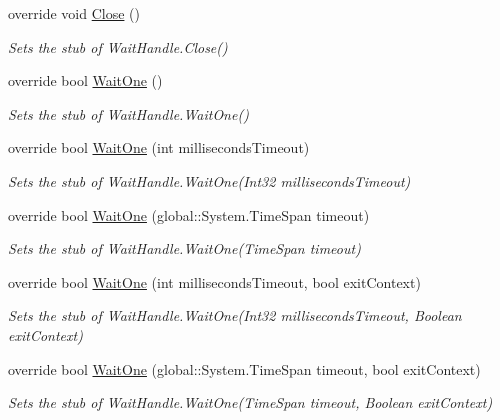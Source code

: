 \begin{DoxyCompactItemize}
override void \hyperlink{class_system_1_1_threading_1_1_fakes_1_1_stub_event_wait_handle_a3d8886b2fec61e02896c79aeb6010262}{Close} ()
\begin{DoxyCompactList}\small\item\em Sets the stub of Wait\-Handle.\-Close()\end{DoxyCompactList}\item 
override bool \hyperlink{class_system_1_1_threading_1_1_fakes_1_1_stub_event_wait_handle_a4b1203c2f75ee993f3c0c0ee2640c25c}{Wait\-One} ()
\begin{DoxyCompactList}\small\item\em Sets the stub of Wait\-Handle.\-Wait\-One()\end{DoxyCompactList}\item 
override bool \hyperlink{class_system_1_1_threading_1_1_fakes_1_1_stub_event_wait_handle_a8563c47b7ea000cb9a0bd5fdf27182c3}{Wait\-One} (int milliseconds\-Timeout)
\begin{DoxyCompactList}\small\item\em Sets the stub of Wait\-Handle.\-Wait\-One(\-Int32 milliseconds\-Timeout)\end{DoxyCompactList}\item 
override bool \hyperlink{class_system_1_1_threading_1_1_fakes_1_1_stub_event_wait_handle_a2f449dbac570a21e54c27fefd47d5407}{Wait\-One} (global\-::\-System.\-Time\-Span timeout)
\begin{DoxyCompactList}\small\item\em Sets the stub of Wait\-Handle.\-Wait\-One(\-Time\-Span timeout)\end{DoxyCompactList}\item 
override bool \hyperlink{class_system_1_1_threading_1_1_fakes_1_1_stub_event_wait_handle_a07101c0180a580a5d408563ecffbe8a1}{Wait\-One} (int milliseconds\-Timeout, bool exit\-Context)
\begin{DoxyCompactList}\small\item\em Sets the stub of Wait\-Handle.\-Wait\-One(\-Int32 milliseconds\-Timeout, Boolean exit\-Context)\end{DoxyCompactList}\item 
override bool \hyperlink{class_system_1_1_threading_1_1_fakes_1_1_stub_event_wait_handle_aa6272e61648883346d30178c83204bb9}{Wait\-One} (global\-::\-System.\-Time\-Span timeout, bool exit\-Context)
\begin{DoxyCompactList}\small\item\em Sets the stub of Wait\-Handle.\-Wait\-One(\-Time\-Span timeout, Boolean exit\-Context)\end{DoxyCompactList}\end{DoxyCompactItemize}
